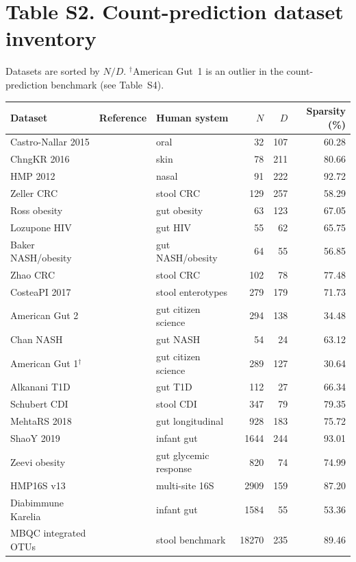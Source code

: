 \section*{Table S2. Count-prediction dataset inventory}
Datasets are sorted by $N/D$.
$^\dagger$American Gut~1 is an outlier in the count-prediction benchmark (see Table~S4).
\footnotesize
\begin{center}
\begin{tabular}{>{\raggedright\arraybackslash}p{}>{\raggedright\arraybackslash}p{}>{\raggedright\arraybackslash}p{}rrr}
\toprule
Dataset & Reference & Human system & $N$ & $D$ & Sparsity (\%) \\
\midrule
Castro-Nallar 2015 & \citealt{CastroNallar2015} & oral & 32 & 107 & 60.28 \\
ChngKR 2016 & \citealt{Chng2016} & skin & 78 & 211 & 80.66 \\
HMP 2012 & \citealt{HMP2012} & nasal & 91 & 222 & 92.72 \\
Zeller CRC & \citealt{Zeller2014} & stool CRC & 129 & 257 & 58.29 \\
Ross obesity & \citealt{Ross2015} & gut obesity & 63 & 123 & 67.05 \\
Lozupone HIV & \citealt{Lozupone2013} & gut HIV & 55 & 62 & 65.75 \\
Baker NASH/obesity & \citealt{Zhu2013} & gut NASH/obesity & 64 & 55 & 56.85 \\
Zhao CRC & \citealt{Wang2012} & stool CRC & 102 & 78 & 77.48 \\
CosteaPI 2017 & \citealt{Costea2017} & stool enterotypes & 279 & 179 & 71.73 \\
American Gut 2 & \citealt{McDonald2018} & gut citizen science & 294 & 138 & 34.48 \\
Chan NASH & \citealt{Wong2013} & gut NASH & 54 & 24 & 63.12 \\
American Gut 1$^\dagger$ & \citealt{McDonald2018} & gut citizen science & 289 & 127 & 30.64 \\
Alkanani T1D & \citealt{Alkanani2015} & gut T1D & 112 & 27 & 66.34 \\
Schubert CDI & \citealt{Schubert2014} & stool CDI & 347 & 79 & 79.35 \\
MehtaRS 2018 & \citealt{Mehta2018} & gut longitudinal & 928 & 183 & 75.72 \\
ShaoY 2019 & \citealt{Shao2019} & infant gut & 1644 & 244 & 93.01 \\
Zeevi obesity & \citealt{Zeevi2015} & gut glycemic response & 820 & 74 & 74.99 \\
HMP16S v13 & \citealt{Huttenhower2012} & multi-site 16S & 2909 & 159 & 87.20 \\
Diabimmune Karelia & \citealt{Vatanen2016} & infant gut & 1584 & 55 & 53.36 \\
MBQC integrated OTUs & \citealt{MBQC2017} & stool benchmark & 18270 & 235 & 89.46 \\
\bottomrule
\end{tabular}
\end{center}
\normalsize

